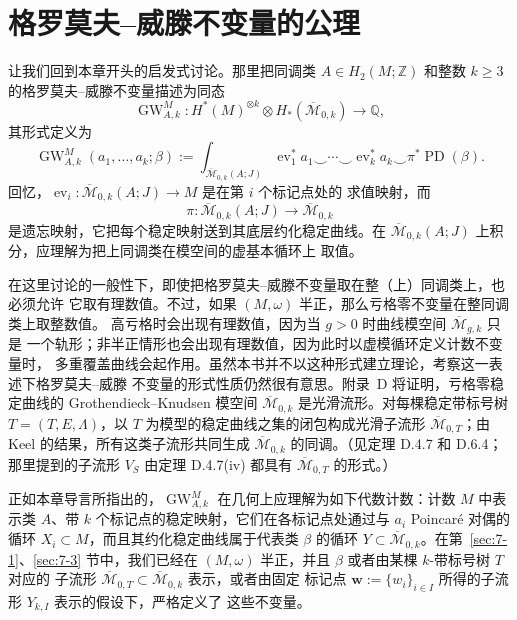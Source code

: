 
\section{格罗莫夫--威滕不变量的公理}\label{sec:7-5}

让我们回到本章开头的启发式讨论。那里把同调类
$A\in H_2(M;\mathbb Z)$ 和整数 $k\ge3$ 的格罗莫夫--威滕不变量描述为同态
\[
  \operatorname{GW}_{A,k}^M:
  H^*(M)^{\otimes k}\otimes H_*(\overline{\mathcal M}_{0,k})
  \longrightarrow\mathbb Q,
\]
其形式定义为
\[
  \operatorname{GW}_{A,k}^M(a_1,\ldots,a_k;\beta)
  :=\int_{\overline{\mathcal M}_{0,k}(A;J)}
  \operatorname{ev}_1^*a_1\smile\cdots\smile
  \operatorname{ev}_k^*a_k\smile\pi^*\operatorname{PD}(\beta).
\]
回忆，$\operatorname{ev}_i:\overline{\mathcal M}_{0,k}(A;J)\to M$ 是在第 $i$ 个标记点处的
求值映射，而
\[
  \pi:\overline{\mathcal M}_{0,k}(A;J)
  \longrightarrow\overline{\mathcal M}_{0,k}
\]
是遗忘映射，它把每个稳定映射送到其底层约化稳定曲线。在
$\overline{\mathcal M}_{0,k}(A;J)$ 上积分，应理解为把上同调类在模空间的虚基本循环上
取值。

在这里讨论的一般性下，即使把格罗莫夫--威滕不变量取在整（上）同调类上，也必须允许
它取有理数值。不过，如果 $(M,\omega)$ 半正，那么亏格零不变量在整同调类上取整数值。
高亏格时会出现有理数值，因为当 $g>0$ 时曲线模空间 $\overline{\mathcal M}_{g,k}$ 只是
一个轨形；非半正情形也会出现有理数值，因为此时以虚模循环定义计数不变量时，
多重覆盖曲线会起作用。虽然本书并不以这种形式建立理论，考察这一表述下格罗莫夫--威滕
不变量的形式性质仍然很有意思。附录~D 将证明，亏格零稳定曲线的
Grothendieck--Knudsen 模空间 $\overline{\mathcal M}_{0,k}$ 是光滑流形。对每棵稳定带标号树
$T=(T,E,\Lambda)$，以 $T$ 为模型的稳定曲线之集的闭包构成光滑子流形
$\overline{\mathcal M}_{0,T}$；由 Keel  的结果，所有这类子流形共同生成
$\overline{\mathcal M}_{0,k}$ 的同调。（见定理 D.4.7 和 D.6.4；那里提到的子流形 $V_S$
由定理 D.4.7(iv) 都具有 $\overline{\mathcal M}_{0,T}$ 的形式。）

正如本章导言所指出的，$\operatorname{GW}_{A,k}^M$ 在几何上应理解为如下代数计数：计数
$M$ 中表示类 $A$、带 $k$ 个标记点的稳定映射，它们在各标记点处通过与 $a_i$ Poincaré
对偶的循环 $X_i\subset M$，而且其约化稳定曲线属于代表类
$\beta$ 的循环 $Y\subset\overline{\mathcal M}_{0,k}$。在第~\ref{sec:7-1}、\ref{sec:7-3}
节中，我们已经在 $(M,\omega)$ 半正，并且 $\beta$ 或者由某棵 $k$-带标号树 $T$ 对应的
子流形 $\overline{\mathcal M}_{0,T}\subset\overline{\mathcal M}_{0,k}$ 表示，或者由固定
标记点 $\mathbf w:=\{w_i\}_{i\in I}$ 所得的子流形 $Y_{k,I}$ 表示的假设下，严格定义了
这些不变量。

